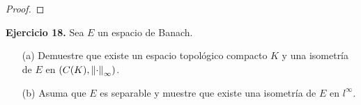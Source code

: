 \begin{proof}
    
\end{proof}



\textbf{Ejercicio 18.} Sea $E$ un espacio de Banach.
\begin{enumerate}
    \item[(a)] Demuestre que existe un espacio topológico compacto $K$ y una isometría de $E$ en $(C(K),\left\|\cdot\right\|_\infty)$. 

    \item[(b)] Asuma que $E$ es separable y muestre que existe una isometría de $E$ en $l^\infty$.
\end{enumerate}
